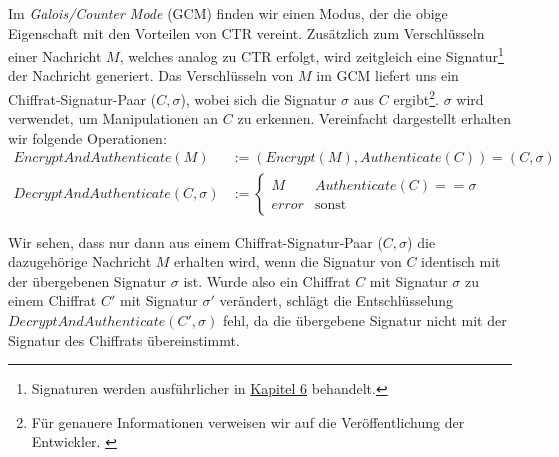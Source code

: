 Im \textit{Galois/Counter Mode} (GCM) finden wir einen Modus, der die obige Eigenschaft mit den Vorteilen von CTR vereint. Zusätzlich zum Verschlüsseln einer Nachricht $M$, welches analog zu CTR erfolgt, wird zeitgleich eine Signatur\footnote{Signaturen werden ausführlicher in \hyperref[cha6]{Kapitel 6} behandelt.} der Nachricht generiert. Das Verschlüsseln von $M$ im GCM liefert uns ein Chiffrat-Signatur-Paar ($C, \sigma$), wobei sich die Signatur $\sigma$ aus $C$ ergibt\footnote{Für genauere Informationen verweisen wir auf die Veröffentlichung der Entwickler. \cite{NIST_GCM05}}. 
$\sigma$ wird verwendet, um Manipulationen an $C$ zu erkennen. Vereinfacht dargestellt erhalten wir folgende Operationen:
\begin{align*}
	EncryptAndAuthenticate(M) &:= (Encrypt(M), Authenticate(C)) = (C, \sigma)\\
	DecryptAndAuthenticate(C, \sigma) &:= \begin{cases}
		M & Authenticate(C) == \sigma\\
		error & \text{sonst}
	\end{cases}
\end{align*}

Wir sehen, dass nur dann aus einem Chiffrat-Signatur-Paar ($C, \sigma$) die dazugehörige Nachricht $M$ erhalten wird, wenn die Signatur von $C$ identisch mit der übergebenen Signatur $\sigma$ ist. Wurde also ein Chiffrat $C$ mit Signatur $\sigma$ zu einem Chiffrat $C'$ mit Signatur $\sigma'$ verändert, schlägt die Entschlüsselung $DecryptAndAuthenticate(C', \sigma)$ fehl, da die übergebene Signatur nicht mit der Signatur des Chiffrats übereinstimmt.

